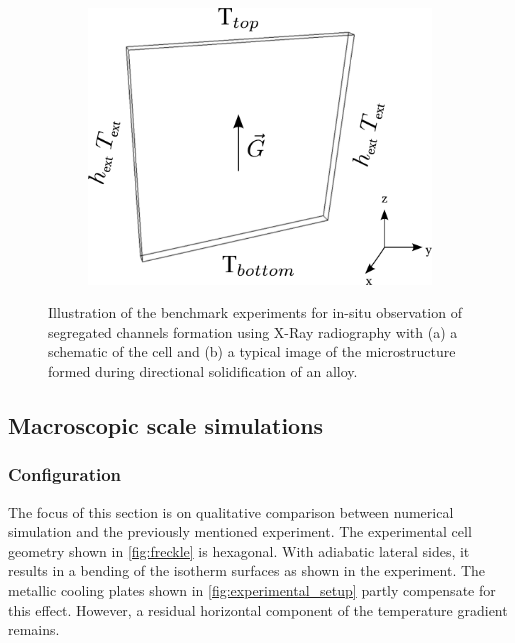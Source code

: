 \begin{figure}[htbp]
\begin{subfigure}{0.5\textwidth}
	\includegraphics[width=\textwidth]{Chapter4/Graphics/freckle_fe/config.pdf}
	\caption{}
    \label{fig:simulation_domain}
  \end{subfigure}
\caption{Illustration of the benchmark experiments for in-situ observation of segregated channels
formation using X-Ray radiography with (a) a schematic of the cell and (b) a typical image 
of the microstructure formed during directional solidification of an  alloy.} 
\label{fig:experimental_freckles}
\end{figure}

\subsection{Macroscopic scale simulations}

\subsubsection{Configuration}
The focus of this section is on qualitative comparison between numerical simulation and the previously mentioned experiment. 
The experimental cell geometry shown in \cref{fig:freckle} is hexagonal. With adiabatic lateral sides, it results in a 
bending of the isotherm surfaces as shown in the experiment. The metallic cooling plates shown in \cref{fig:experimental_setup}
partly compensate for this effect. However, a residual horizontal component of the temperature gradient 
remains. 

